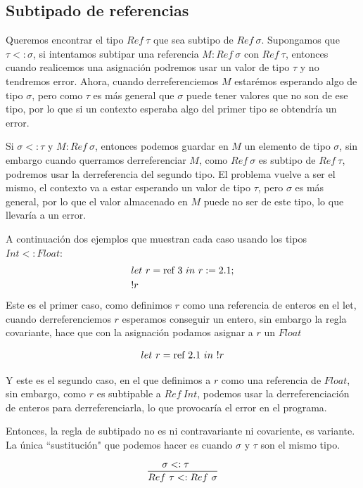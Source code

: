 \subsection{Subtipado de referencias}
Queremos encontrar el tipo $Ref~\tau$ que sea subtipo de $Ref~\sigma$. Supongamos que $\tau <: \sigma$, si intentamos subtipar una referencia $M:Ref~\sigma$ con $Ref~\tau$, entonces cuando realicemos una asignación podremos usar un valor de tipo $\tau$ y no tendremos error. Ahora, cuando derreferenciemos $M$ estarémos esperando algo de tipo $\sigma$, pero como $\tau$ es más general que $\sigma$ puede tener valores que no son de ese tipo, por lo que si un contexto esperaba algo del primer tipo se obtendría un error.

Si  $\sigma <: \tau$ y $M: Ref~\sigma$, entonces podemos guardar en $M$ un elemento de tipo $\sigma$, sin embargo cuando querramos derreferenciar $M$, como $Ref~\sigma$ es subtipo de $Ref~\tau$, podremos usar la derreferencia del segundo tipo. El problema vuelve a ser el mismo, el contexto va a estar esperando un valor de tipo $\tau$, pero $\sigma$ es más general, por lo que el valor almacenado en $M$ puede no ser de este tipo, lo que llevaría a un error.

A continuación dos ejemplos que muestran cada caso usando los tipos $Int <: Float$:
\begin{align*}
&let~r = \text{ref}~3~in~r := 2.1; \\
&!r
\end{align*}
Este es el primer caso, como definimos $r$ como una referencia de enteros en el let, cuando derreferenciemos $r$ esperamos conseguir un entero, sin embargo la regla covariante, hace que con la asignación podamos asignar a $r$ un $Float$

\begin{align}
let~r = \text{ref}~2.1~in~!r
\end{align}

Y este es el segundo caso, en el que definimos a $r$ como una referencia de $Float$, sin embargo, como $r$ es subtipable a $Ref~Int$, podemos usar la derreferenciación de enteros para derreferenciarla, lo que provocaría el error en el programa.

Entonces, la regla de subtipado no es ni contravariante ni covariente, es variante. La única ``sustitución" que podemos hacer es cuando $\sigma$ y $\tau$ son el mismo tipo.

$$\frac{\sigma <: \tau\hspace*{5mm}}{Ref~\tau <: Ref~\sigma}$$


